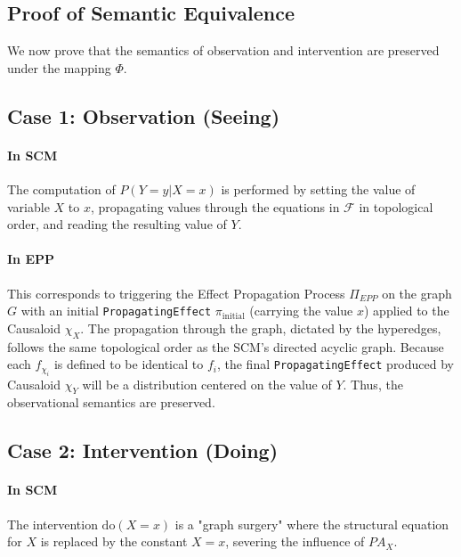 \newpage

\subsection*{Proof of Semantic Equivalence}

We now prove that the semantics of observation and intervention are preserved under the mapping \(\Phi\).

\subsection*{Case 1: Observation (Seeing)}
\paragraph{In SCM} The computation of \(P(Y=y | X=x)\) is performed by setting the value of variable \(X\) to \(x\), propagating values through the equations in \(\mathcal{F}\) in topological order, and reading the resulting value of \(Y\).

\paragraph{In EPP} This corresponds to triggering the Effect Propagation Process \(\Pi_{EPP}\) on the graph \(G\) with an initial \texttt{PropagatingEffect} \(\pi_{\text{initial}}\) (carrying the value \(x\)) applied to the Causaloid \(\chi_X\). The propagation through the graph, dictated by the hyperedges, follows the same topological order as the SCM's directed acyclic graph. Because each \(f_{\chi_i}\) is defined to be identical to \(f_i\), the final \texttt{PropagatingEffect} produced by Causaloid \(\chi_Y\) will be a distribution centered on the value of \(Y\). Thus, the observational semantics are preserved.

\subsection*{Case 2: Intervention (Doing)}
\paragraph{In SCM} The intervention \(\text{do}(X=x)\) is a "graph surgery" where the structural equation for \(X\) is replaced by the constant \(X=x\), severing the influence of \(PA_X\).

